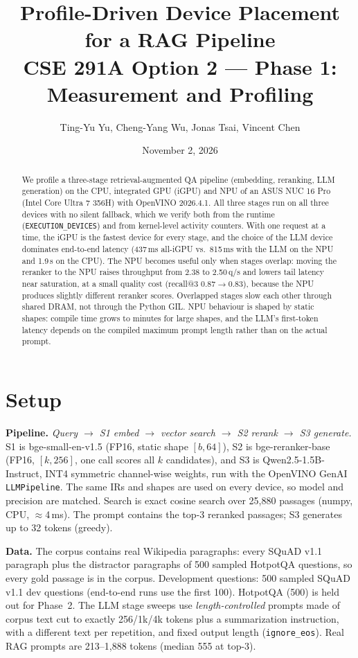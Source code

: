 \documentclass[10pt]{article}
\title{\textbf{Profile-Driven Device Placement for a RAG Pipeline}\\[2pt]
\large CSE 291A Option 2 --- Phase 1: Measurement and Profiling}
\author{Ting-Yu Yu, Cheng-Yang Wu, Jonas Tsai, Vincent Chen}
\date{November 2, 2026}
\begin{document}
\maketitle

\begin{abstract}
We profile a three-stage retrieval-augmented QA pipeline (embedding, reranking, LLM generation) on the CPU,
integrated GPU (iGPU) and NPU of an ASUS NUC 16 Pro (Intel Core Ultra 7 356H) with OpenVINO 2026.4.1.
All three stages run on all three devices with no silent fallback, which we verify both from the runtime
(\texttt{EXECUTION\_DEVICES}) and from kernel-level activity counters. With one request at a time, the iGPU is
the fastest device for every stage, and the choice of the LLM device dominates end-to-end latency
(437\,ms all-iGPU vs.\ 815\,ms with the LLM on the NPU and 1.9\,s on the CPU). The NPU becomes useful only when
stages overlap: moving the reranker to the NPU raises throughput from 2.38 to 2.50\,q/s and lowers tail
latency near saturation, at a small quality cost (recall@3 0.87$\to$0.83), because the NPU produces
slightly different reranker scores. Overlapped stages slow each other through shared DRAM, not through the
Python GIL. NPU behaviour is shaped by static shapes: compile time grows to minutes for large shapes, and the
LLM's first-token latency depends on the compiled maximum prompt length rather than on the actual prompt.
\end{abstract}

\section{Setup}

\textbf{Pipeline.} \textit{Query $\to$ S1 embed $\to$ vector search $\to$ S2 rerank $\to$ S3 generate.}
S1 is bge-small-en-v1.5 (FP16, static shape $[b,64]$), S2 is bge-reranker-base (FP16, $[k,256]$, one call
scores all $k$ candidates), and S3 is Qwen2.5-1.5B-Instruct, INT4 symmetric channel-wise weights, run with the
OpenVINO GenAI \texttt{LLMPipeline}. The same IRs and shapes are used on every device, so model and precision
are matched. Search is exact cosine search over 25{,}880 passages (numpy, CPU, $\approx$4\,ms). The prompt
contains the top-3 reranked passages; S3 generates up to 32 tokens (greedy).

\textbf{Data.} The corpus contains real Wikipedia paragraphs: every SQuAD v1.1 paragraph plus the distractor
paragraphs of 500 sampled HotpotQA questions, so every gold passage is in the corpus. Development questions:
500 sampled SQuAD v1.1 dev questions (end-to-end runs use the first 100). HotpotQA (500) is held out for
Phase~2. The LLM stage sweeps use \emph{length-controlled} prompts made of corpus text cut to exactly
256/1k/4k tokens plus a summarization instruction, with a different text per repetition, and fixed output
length (\texttt{ignore\_eos}). Real RAG prompts are 213--1{,}888 tokens (median 555 at top-3).
\end{document}
